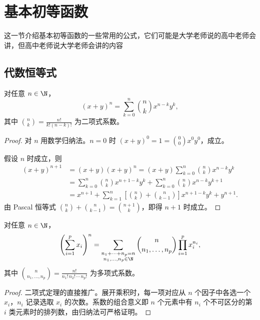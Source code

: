 \section{基本初等函数}
这一节介绍基本初等函数的一些常用的公式，它们可能是大学老师说的高中老师会讲，但高中老师说大学老师会讲的内容
\subsection*{代数恒等式}
\begin{proposition}[二项式定理]
	对任意 $n \in \N$，
	\[
	(x+y)^n = \sum_{k=0}^{n} \binom{n}{k} x^{n-k} y^k,
	\]
	其中 $\displaystyle\binom{n}{k} = \frac{n!}{k!(n-k)!}$ 为二项式系数。
\end{proposition}

\begin{proof}
	对 $n$ 用数学归纳法。$n=0$ 时 $(x+y)^0 = 1 = \binom{0}{0}x^0y^0$，成立。
	
	假设 $n$ 时成立，则
	\[
	\begin{aligned}
	(x+y)^{n+1} &= (x+y)(x+y)^n = (x+y)\sum_{k=0}^{n}\binom{n}{k}x^{n-k}y^k \\
	&= \sum_{k=0}^{n}\binom{n}{k}x^{n+1-k}y^k + \sum_{k=0}^{n}\binom{n}{k}x^{n-k}y^{k+1} \\
	&= x^{n+1} + \sum_{k=1}^{n}\left[\binom{n}{k}+\binom{n}{k-1}\right]x^{n+1-k}y^k + y^{n+1}.
	\end{aligned}
	\]
	由 Pascal 恒等式 $\binom{n}{k} + \binom{n}{k-1} = \binom{n+1}{k}$，即得 $n+1$ 时成立。
\end{proof}

\begin{proposition}[多项式定理]
	对任意 $n \in \N$，
	\[
	\left(\sum_{i=1}^{p} x_i\right)^n = \sum_{\substack{n_1+\cdots+n_p = n \\ n_1,\dots,n_p \in \N}} \binom{n}{n_1,\dots,n_p} \prod_{i=1}^{p} x_i^{n_i},
	\]
	其中 $\displaystyle\binom{n}{n_1,\dots,n_p} = \frac{n!}{n_1!\, n_2! \,\cdots\, n_p!}$ 为多项式系数。
\end{proposition}

\begin{proof}
	二项式定理的直接推广。展开乘积时，每一项对应从 $n$ 个因子中各选一个 $x_i$，$n_i$ 记录选取 $x_i$ 的次数。系数的组合意义即 $n$ 个元素中有 $n_i$ 个不可区分的第 $i$ 类元素时的排列数，由归纳法可严格证明。
\end{proof}

